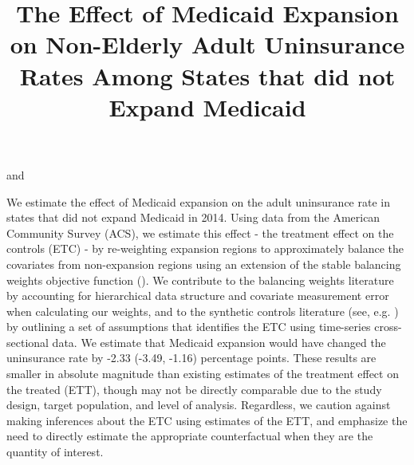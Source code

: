\documentclass[article]{imsart}
\theoremstyle{plain}
\theoremstyle{remark}
\begin{document}
\begin{frontmatter}
\title{The Effect of Medicaid Expansion on Non-Elderly Adult Uninsurance Rates Among States that did not Expand Medicaid}
\runtitle{}

\begin{aug}
\author[A]{ } and
\author[A]{ }
\address[A]{Carnegie Mellon University, Heinz College and Department of Statistics and Data Science }

\end{aug}

\begin{flushleft}
We estimate the effect of Medicaid expansion on the adult uninsurance rate in states that did not expand Medicaid in 2014. Using data from the American Community Survey (ACS), we estimate this effect - the treatment effect on the controls (ETC) - by re-weighting expansion regions to approximately balance the covariates from non-expansion regions using an extension of the stable balancing weights objective function (\cite{zubizarreta2015stable}). We contribute to the balancing weights literature by accounting for hierarchical data structure and covariate measurement error when calculating our weights, and to the synthetic controls literature (see, e.g. \cite{abadie2010synthetic}) by outlining a set of assumptions that identifies the ETC using time-series cross-sectional data. We estimate that Medicaid expansion would have changed the uninsurance rate by -2.33 (-3.49, -1.16) percentage points. These results are smaller in absolute magnitude than existing estimates of the treatment effect on the treated (ETT), though may not be directly comparable due to the study design, target population, and level of analysis. Regardless, we caution against making inferences about the ETC using estimates of the ETT, and emphasize the need to directly estimate the appropriate counterfactual when they are the quantity of interest.
\end{flushleft}


\begin{keyword}
\end{keyword}

\end{frontmatter}
\end{document}
